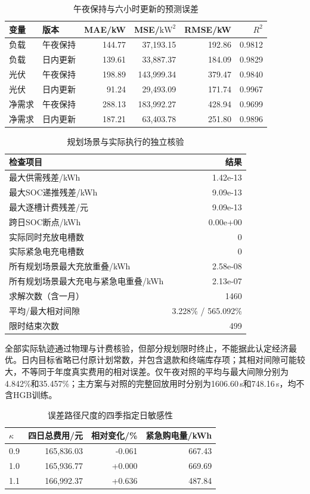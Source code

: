 \begin{table}[htbp]
\centering\small
\caption{午夜保持与六小时更新的预测误差}\label{tab:q3-prediction}
\begin{tabular}{llrrrr}
\toprule
变量 & 版本 & MAE/kW & MSE/$\mathrm{kW}^2$ & RMSE/kW & $R^2$\\
\midrule
负载 & 午夜保持 & 144.77 & 37,193.15 & 192.86 & 0.9812\\
负载 & 日内更新 & 139.61 & 33,887.37 & 184.09 & 0.9829\\
光伏 & 午夜保持 & 198.89 & 143,999.34 & 379.47 & 0.9840\\
光伏 & 日内更新 & 91.24 & 29,493.09 & 171.74 & 0.9967\\
净需求 & 午夜保持 & 288.13 & 183,992.27 & 428.94 & 0.9699\\
净需求 & 日内更新 & 187.21 & 63,403.78 & 251.80 & 0.9896\\
\bottomrule
\end{tabular}
\end{table}
\begin{table}[htbp]
\centering\small
\caption{规划场景与实际执行的独立核验}\label{tab:q3-verification}
\begin{tabular}{lr}
\toprule
检查项目 & 结果\\
\midrule
最大供需残差/kWh & 1.42e-13\\
最大SOC递推残差/kWh & 9.09e-13\\
最大逐槽计费残差/元 & 9.09e-13\\
跨日SOC断点/kWh & 0.00e+00\\
实际同时充放电槽数 & 0\\
实际紧急电充电槽数 & 0\\
所有规划场景最大充放重叠/kWh & 2.58e-08\\
所有规划场景最大充电与紧急电重叠/kWh & 2.13e-07\\
求解次数（含一月） & 1460\\
平均/最大相对间隙 & 3.228\% / 565.092\%\\
限时结束次数 & 499\\
\bottomrule
\end{tabular}
\end{table}
全部实际轨迹通过物理与计费核验，但部分规划限时终止，不能据此认定经济最优。日内目标省略已付原计划常数，并包含退款和终端库存项；其相对间隙可能较大，不等同于年度真实费用的相对误差。仅午夜对照的平均与最大间隙分别为4.842\%和35.457\%；主方案与对照的完整回放用时分别为1606.60\,s和748.16\,s，均不含HGB训练。
\begin{table}[htbp]
\centering\small
\caption{误差路径尺度的四季指定日敏感性}\label{tab:q3-sensitivity}
\begin{tabular}{lrrr}
\toprule
$\kappa$ & 四日总费用/元 & 相对变化/\% & 紧急购电量/kWh\\
\midrule
0.9 & 165,836.03 & -0.061 & 667.43\\
1.0 & 165,936.77 & +0.000 & 669.69\\
1.1 & 166,992.37 & +0.636 & 487.84\\
\bottomrule
\end{tabular}
\end{table}
